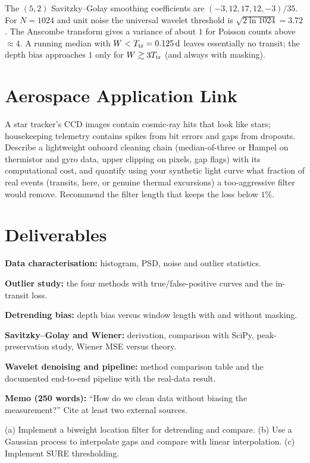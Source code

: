 \documentclass[11pt,a4paper]{article}
\begin{document}
\begin{checkpoint}
The $(5,2)$ Savitzky--Golay smoothing coefficients are $(-3,12,17,12,-3)/35$. For $N=1024$ and unit noise the universal wavelet threshold is $\sqrt{2\ln1024}=3.72$. The Anscombe transform gives a variance of about $1$ for Poisson counts above $\approx4$. A running median with $W<T_{\rm tr}=\SI{0.125}{\day}$ leaves essentially no transit; the depth bias approaches $1$ only for $W\gtrsim3T_{\rm tr}$ (and always with masking).
\end{checkpoint}

\section*{Aerospace Application Link}
A star tracker's CCD images contain cosmic-ray hits that look like stars; housekeeping telemetry contains spikes from bit errors and gaps from dropouts. Describe a lightweight onboard cleaning chain (median-of-three or Hampel on thermistor and gyro data, upper clipping on pixels, gap flags) with its computational cost, and quantify using your synthetic light curve what fraction of real events (transits, here, or genuine thermal excursions) a too-aggressive filter would remove. Recommend the filter length that keeps the loss below $1\%$.

\section*{Deliverables}
\begin{delivs}
  \item[D1] \textbf{Data characterisation:} histogram, PSD, noise and outlier statistics.
  \item[D2] \textbf{Outlier study:} the four methods with true/false-positive curves and the in-transit loss.
  \item[D3] \textbf{Detrending bias:} depth bias versus window length with and without masking.
  \item[D4] \textbf{Savitzky--Golay and Wiener:} derivation, comparison with SciPy, peak-preservation study, Wiener MSE versus theory.
  \item[D5] \textbf{Wavelet denoising and pipeline:} method comparison table and the documented end-to-end pipeline with the real-data result.
  \item[D6] \textbf{Memo (250 words):} ``How do we clean data without biasing the measurement?'' Cite at least two external sources.
  \item[Bonus] (a) Implement a biweight location filter for detrending and compare. (b) Use a Gaussian process to interpolate gaps and compare with linear interpolation. (c) Implement SURE thresholding.
\end{delivs}
\end{document}
